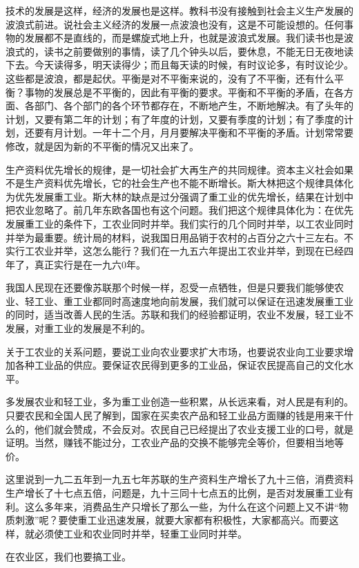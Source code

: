 技术的发展是这样，经济的发展也是这样。教科书没有接触到社会主义生产发展的波浪式前进。说社会主义经济的发展一点波浪也没有，这是不可能设想的。任何事物的发展都不是直线的，而是螺旋式地上升，也就是波浪式发展。我们读书也是波浪式的，读书之前要做别的事情，读了几个钟头以后，要休息，不能无日无夜地读下去。今天读得多，明天读得少；而且每天读的时候，有时议论多，有时议论少。这些都是波浪，都是起伏。平衡是对不平衡来说的，没有了不平衡，还有什么平衡？事物的发展总是不平衡的，因此有平衡的要求。平衡和不平衡的矛盾，在各方面、各部门、各个部门的各个环节都存在，不断地产生，不断地解决。有了头年的计划，又要有第二年的计划；有了年度的计划，又要有季度的计划；有了季度的计划，还要有月计划。一年十二个月，月月要解决平衡和不平衡的矛盾。计划常常要修改，就是因为新的不平衡的情况又出来了。

生产资料优先增长的规律，是一切社会扩大再生产的共同规律。资本主义社会如果不是生产资料优先增长，它的社会生产也不能不断增长。斯大林把这个规律具体化为优先发展重工业。斯大林的缺点是过分强调了重工业的优先增长，结果在计划中把农业忽略了。前几年东欧各国也有这个问题。我们把这个规律具体化为：在优先发展重工业的条件下，工农业同时并举。我们实行的几个同时并举，以工农业同时并举为最重要。统计局的材料，说我国日用品销于农村的占百分之六十三左右。不实行工农业并举，这怎么能行？我们在一九五六年提出工农业并举，到现在已经四年了，真正实行是在一九六0年。

我国人民现在还要像苏联那个时候一样，忍受一点牺牲，但是只要我们能够使农业、轻工业、重工业都同时高速度地向前发展，我们就可以保证在迅速发展重工业的同时，适当改善人民的生活。苏联和我们的经验都证明，农业不发展，轻工业不发展，对重工业的发展是不利的。

关于工农业的关系问题，要说工业向农业要求扩大市场，也要说农业向工业要求增加各种工业品的供应。要保证农民得到更多的工业品，保证农民提高自己的文化水平。

多发展农业和轻工业，多为重工业创造一些积累，从长远来看，对人民是有利的。只要农民和全国人民了解到，国家在买卖农产品和轻工业品方面赚的钱是用来干什么的，他们就会赞成，不会反对。农民自己已经提出了农业支援工业的口号，就是证明。当然，赚钱不能过分，工农业产品的交换不能够完全等价，但要相当地等价。

这里说到一九二五年到一九五七年苏联的生产资料生产增长了九十三倍，消费资料生产增长了十七点五倍，问题是，九十三同十七点五的比例，是否对发展重工业有利。这么多年来，消费品生产只增长了那么一些，为什么在这个问题上又不讲“物质刺激”呢？要使重工业迅速发展，就要大家都有积极性，大家都高兴。而要这样，就必须使工业和农业同时并举，轻重工业同时并举。

在农业区，我们也要搞工业。


